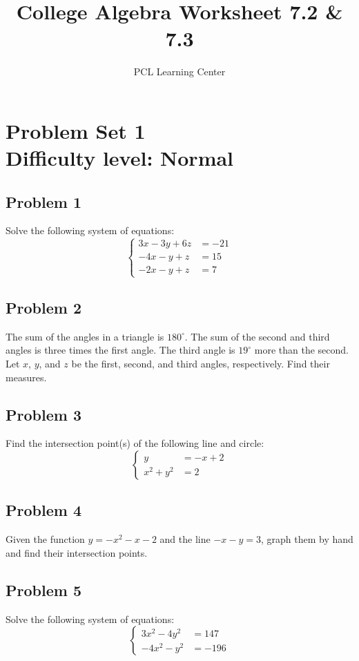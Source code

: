 \documentclass[12pt]{article}
\title{College Algebra Worksheet 7.2 \& 7.3}
\author{PCL Learning Center}
\date{}
\begin{document}
\maketitle

\section*{Problem Set 1\\Difficulty level: Normal}
\subsection*{Problem 1}
Solve the following system of equations:
\[
\left\{
\begin{aligned}
3x - 3y + 6z &= -21\\
-4x - y + z &= 15\\
-2x - y + z &= 7
\end{aligned}
\right.
\]

\subsection*{Problem 2}
The sum of the angles in a triangle is \(180^\circ\). The sum of the second and third angles is three times the first angle. The third angle is \(19^\circ\) more than the second. Let \(x\), \(y\), and \(z\) be the first, second, and third angles, respectively. Find their measures.

\subsection*{Problem 3}
Find the intersection point(s) of the following line and circle:
\[
\left\{
\begin{aligned}
y &= -x + 2\\
x^2 + y^2 &= 2
\end{aligned}
\right.
\]

\subsection*{Problem 4}
Given the function \(y = -x^2-x-2\) and the line \(-x-y=3\), graph them by hand and find their intersection points.

\subsection*{Problem 5}
Solve the following system of equations:
\[
\left\{
\begin{aligned}
3x^2-4y^2 &= 147\\[6pt]
-4x^2-y^2 &= -196
\end{aligned}
\right.
\]
\end{document}
